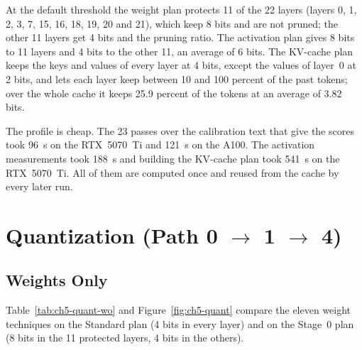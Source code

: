 \documentclass[
11pt, %
english, %
singlespacing, %
headsepline, %
]{MastersDoctoralThesis} %
\begin{document}
At the default threshold the weight plan protects 11 of the 22 layers (layers 0, 1, 2, 3, 7, 15, 16, 18, 19, 20 and 21), which keep 8 bits and are not pruned; the other 11 layers get 4 bits and the pruning ratio. The activation plan gives 8 bits to 11 layers and 4 bits to the other 11, an average of 6 bits. The KV-cache plan keeps the keys and values of every layer at 4 bits, except the values of layer~0 at 2 bits, and lets each layer keep between 10 and 100 percent of the past tokens; over the whole cache it keeps 25.9 percent of the tokens at an average of 3.82 bits.

The profile is cheap. The 23 passes over the calibration text that give the scores took 96~s on the RTX~5070~Ti and 121~s on the A100. The activation measurements took 188~s and building the KV-cache plan took 541~s on the RTX~5070~Ti. All of them are computed once and reused from the cache by every later run.

\section{Quantization (Path 0 $\rightarrow$ 1 $\rightarrow$ 4)}
\label{sec:ch5-quant}

\subsection{Weights Only}

Table~\ref{tab:ch5-quant-wo} and Figure~\ref{fig:ch5-quant} compare the eleven weight techniques on the Standard plan (4 bits in every layer) and on the Stage~0 plan (8 bits in the 11 protected layers, 4 bits in the others).
\end{document}
